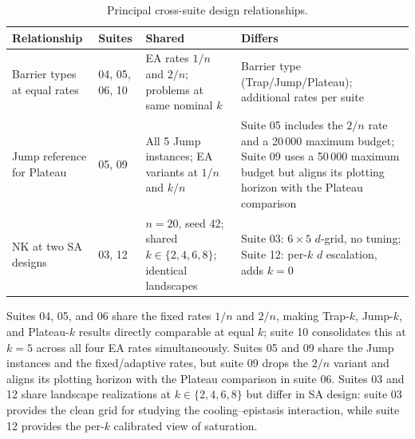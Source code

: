 \begin{table}[H]
  \centering
  \small
  \begin{tabular}{@{}p{2.5cm}p{2cm}p{5.0cm}p{5.0cm}@{}}
    \toprule
    \textbf{Relationship} & \textbf{Suites} & \textbf{Shared} &
    \textbf{Differs} \\
    \midrule
    Barrier types at equal rates
    & 04, 05, 06, 10
    & EA rates $1/n$ and $2/n$; problems at same nominal $k$
    & Barrier type (Trap/Jump/Plateau); additional rates per suite \\
    \addlinespace
    Jump reference for Plateau
    & 05, 09
    & All 5 Jump instances; EA variants at $1/n$ and $k/n$
    & Suite 05 includes the $2/n$ rate and a 20\,000 maximum budget; Suite 09
    uses a 50\,000 maximum budget but aligns its plotting horizon with the
    Plateau comparison \\
    \addlinespace
    NK at two SA designs
    & 03, 12
    & $n=20$, seed 42; shared $k\in\{2,4,6,8\}$; identical landscapes
    & Suite 03: $6\times5$ $d$-grid, no tuning; Suite 12: per-$k$ $d$
    escalation, adds $k=0$ \\
    \bottomrule
  \end{tabular}
  \caption{Principal cross-suite design relationships.}
  \label{tab:cross-suite}
\end{table}

Suites 04, 05, and 06 share the fixed rates $1/n$ and $2/n$, making Trap-$k$,
Jump-$k$, and Plateau-$k$ results directly comparable at equal $k$; suite 10
consolidates this at $k=5$ across all four EA rates simultaneously. Suites 05
and 09 share the Jump instances and the fixed/adaptive rates, but suite 09 drops
the $2/n$ variant and aligns its plotting horizon with the Plateau comparison in
suite 06.
Suites 03 and 12 share landscape realizations at $k \in \{2,4,6,8\}$ but
differ in SA design: suite 03 provides the clean grid for studying the
cooling--epistasis interaction, while suite 12 provides the per-$k$ calibrated
view of saturation.
